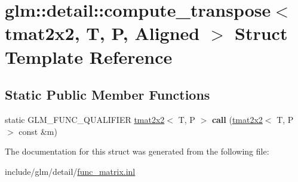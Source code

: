 \hypertarget{structglm_1_1detail_1_1compute__transpose_3_01tmat2x2_00_01T_00_01P_00_01Aligned_01_4}{}\section{glm\+:\+:detail\+:\+:compute\+\_\+transpose$<$ tmat2x2, T, P, Aligned $>$ Struct Template Reference}
\label{structglm_1_1detail_1_1compute__transpose_3_01tmat2x2_00_01T_00_01P_00_01Aligned_01_4}
\subsection*{Static Public Member Functions}
\begin{DoxyCompactItemize}
\item 
\mbox{\label{structglm_1_1detail_1_1compute__transpose_3_01tmat2x2_00_01T_00_01P_00_01Aligned_01_4_a9668df2ce71362d2dd4254439b78c22c}} 
static G\+L\+M\+\_\+\+F\+U\+N\+C\+\_\+\+Q\+U\+A\+L\+I\+F\+I\+ER \hyperlink{structglm_1_1tmat2x2}{tmat2x2}$<$ T, P $>$ {\bfseries call} (\hyperlink{structglm_1_1tmat2x2}{tmat2x2}$<$ T, P $>$ const \&m)
\end{DoxyCompactItemize}


The documentation for this struct was generated from the following file\+:\begin{DoxyCompactItemize}
\item 
include/glm/detail/\hyperlink{func__matrix_8inl}{func\+\_\+matrix.\+inl}\end{DoxyCompactItemize}

